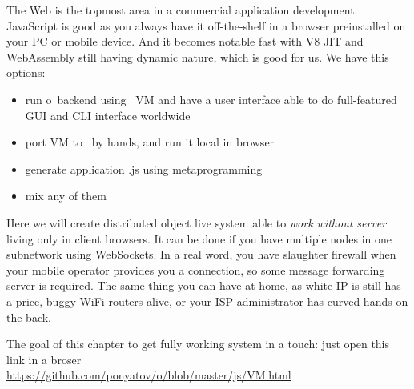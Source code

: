 \clearpage{}\label{jsweb}\secdown

The Web is the topmost area in a commercial application development. JavaScript
is good as you always have it off-the-shelf in a browser preinstalled on your PC
or mobile device. And it becomes notable fast with V8 JIT and WebAssembly still
having dynamic nature, which is good for us. We have this options:
\begin{itemize}[nosep]
  \item run o\F\ backend using \py\ VM and have a user interface able
  to do full-featured GUI and CLI interface worldwide
  \item port VM to \js\ by hands, and run it local in browser
  \item generate application .js using metaprogramming
  \item mix any of them 
\end{itemize}
\pg Here we will create distributed object live system able to \emph{work
without server} living only in client browsers. It can be done if you have
multiple nodes in one subnetwork using WebSockets. In a real word, you have
slaughter firewall when your mobile operator provides you a connection, so some
message forwarding server is required. The same thing you can have at home, as
white IP is still has a price, buggy WiFi routers alive, or your ISP
administrator has curved hands on the back.

\bigskip\noindent
The goal of this chapter to get fully working system in a touch: just open
this link in a broser\\
\url{https://github.com/ponyatov/o/blob/master/js/VM.html}



\secup
